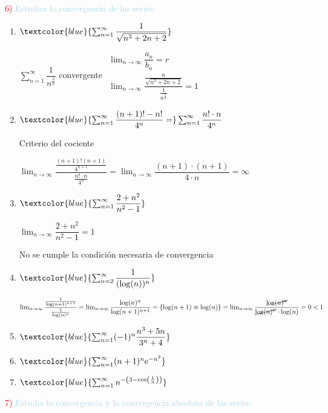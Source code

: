 \textcolor{red}{6) }\textcolor{lightblue}{Estudiar la convergencia de las series:}
\begin{enumerate}[label=\color{red}\alph*)]
	\item $\textcolor{blue}{\sum_{n=1}^{\infty}\dfrac{1}{\sqrt{n^3+2n+2}}}$
	
	$\sum_{n=1}^{\infty}\dfrac{1}{n^{\frac{3}{2}}}$ convergente $\begin{array}{l}
		\lim_{n\to\infty}\dfrac{a_n}{b_n}=r\\
		\lim_{n\to\infty}\dfrac{\frac{n}{\sqrt{n^3+2n+2}}}{\frac{1}{n^{\frac{3}{2}}}}=1
	\end{array}$
	\item $\textcolor{blue}{\sum_{n=1}^{\infty}\dfrac{(n+1)!-n!}{4^n}=}\sum_{n=1}^{\infty}\dfrac{n!\cdot n}{4^n}$
	
	Criterio del cociente
	
	$\lim_{n\to\infty}\dfrac{\frac{(n+1)!(n+1)}{4^{n+1}}}{\frac{n!\cdot n}{4^n}}=\lim_{n\to\infty}\dfrac{(n+1)\cdot(n+1)}{4\cdot n}=\infty$
	\item $\textcolor{blue}{\sum_{n=1}^{\infty}\dfrac{2+n^2}{n^2-1}}$
	
	$\lim_{n\to\infty}\dfrac{2+n^2}{n^2-1}=1$ 
	
	No se cumple la condición necesaria de convergencia
	\item $\textcolor{blue}{\sum_{n=2}^{\infty}\dfrac{1}{(\log(n))^n}}$
	
	$\lim_{n\to\infty}\dfrac{\frac{1}{\log(n+1)^{n+1}}}{\frac{1}{\log(n)^n}}=\lim_{n\to\infty}\dfrac{\log(n)^n}{\log(n+1)^{n+1}}=\left\{\log(n+1)\equiv \log(n)\right\}=\lim_{n\to\infty}\dfrac{\cancel{\log(n)^n}}{\cancel{\log(n)^n}\cdot\log(n)}=0<1$
	\item $\textcolor{blue}{\sum_{n=1}^{\infty}(-1)^n\dfrac{n^3+5n}{3^n+4}}$
	\item $\textcolor{blue}{\sum_{n=1}^{\infty}(n+1)^n\mathrm{e}^{-n^2}}$
	\item $\textcolor{blue}{\sum_{n=1}^{\infty}n^{-\left(3-\cos\left(\frac{1}{n}\right)\right)}}$
\end{enumerate}

\textcolor{red}{7)} \textcolor{lightblue}{Estudia la convergencia y la convergencia absoluta de las series:}

